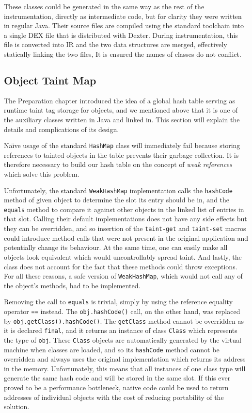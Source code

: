 \documentclass[12pt,twoside,notitlepage]{report}
\begin{document}
These classes could be generated in the same way as the rest of the instrumentation, directly as intermediate code, but for clarity they were written in regular Java. Their source files are compiled using the standard toolchain into a single DEX file that is distributed with Dexter. During instrumentation, this file is converted into IR and the two data structures are merged, effectively statically linking the two files, It is ensured the names of classes do not conflict.

\subsection{Object Taint Map}
\label{section:Code_ObjectTaintMap}

The Preparation chapter introduced the idea of a global hash table serving as runtime taint tag storage for objects, and we mentioned above that it is one of the auxiliary classes written in Java and linked in. This section will explain the details and complications of its design.

Na\"{\i}ve usage of the standard \verb$HashMap$ class will immediately fail because storing references to tainted objects in the table prevents their garbage collection. It is therefore necessary to build our hash table on the concept of \emph{weak references} which solve this problem. 

Unfortunately, the standard \verb$WeakHashMap$ implementation calls the \verb$hashCode$ method of given object to determine the slot its entry should be in, and the \verb$equals$ method to compare it against other objects in the linked list of entries in that slot. Calling their default implementations does not have any side effects but they can be overridden, and so insertion of the \verb$taint-get$ and \verb$taint-set$ macros could introduce method calls that were not present in the original application and potentially change its behaviour. At the same time, one can easily make all objects look equivalent which would uncontrollably spread taint. And lastly, the class does not account for the fact that these methods could throw exceptions. For all these reasons, a safe version of \verb$WeakHashMap$, which would not call any of the object's methods, had to be implemented. 

Removing the call to \verb$equals$ is trivial, simply by using the reference equality operator \verb$==$ instead. The \verb$obj.hashCode()$ call, on the other hand, was replaced by \verb$obj.getClass().hashCode()$. The \verb$getClass$ method cannot be overridden as it is declared \verb$final$, and it returns an instance of class \verb$Class$ which represents the type of \verb$obj$. These \verb$Class$ objects are automatically generated by the virtual machine when classes are loaded, and so its \verb$hashCode$ method cannot be overridden and always uses the original implementation which returns its address in the memory. Unfortunately, this means that all instances of one class type will generate the same hash code and will be stored in the same slot. If this ever proved to be a performance bottleneck, native code could be used to return addresses of individual objects with the cost of reducing portability of the solution. 
\end{document}
